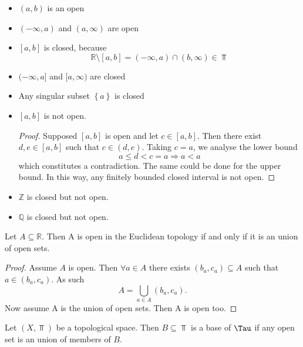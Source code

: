 \documentclass[../../main/main.tex]{subfiles}
\begin{document}
\begin{itemize}
  \item $\left( a, b \right)$ is an open
  \item $\left( -\infty, a \right) $  and $\left( a, \infty \right) $ are open
  \item $\left[ a, b \right] $ is closed, because
    \begin{equation*}
      \mathbb{R} \setminus \left[ a, b \right] = \left( -\infty, a \right) \cap \left( b, \infty \right)  \in \Top
    \end{equation*}
  \item $ ( - \infty, a ]$ and $[a, \infty)$ are closed
  \item Any singular subset $\left\{ a \right\} $ is closed
  \item $ \left[ a, b \right] $ is not open.
    \begin{proof}
      Supposed $\left[ a, b \right] $ is open and let $c \in [a, b]$. Then there exist $d, e \in [a, b]$ such that $c \in (d, e)$. Taking $c = a$, we analyse the lower bound
      \begin{equation*}
        a \leq  d < c =a \Longrightarrow a < a
      \end{equation*}
      which constitutes a contradiction. The same could be done for the upper bound. In this way, any finitely bounded closed interval is not open.
    \end{proof}
  \item $\mathbb{Z}$ is closed but not open.
  \item $\mathbb{Q}$ is closed but not open.
\end{itemize}

\begin{theorem}
  Let $A \subseteq \mathbb{R}$. Then A is open in the Euclidean topology if and only if it is an union of open sets.
\end{theorem}
\begin{proof}
  Assume $A$ is open. Then $\forall a \in A$ there exists $(b_{a}, c_{a}) \subseteq A$ such that $a \in (b_{a}, c_{a})$. As such
  \begin{equation*}
    A = \bigcup_{a \in A} (b_{a}, c_{a}).
  \end{equation*}
  Now assume A is the union of open sets. Then A is open too.
\end{proof}

\begin{definition}
  Let $(X, \Top)$ be a topological space. Then $B \subseteq \Top$ is a base of $\Tau$ if any open set is an union of members of $B$.
\end{definition}
\end{document}
